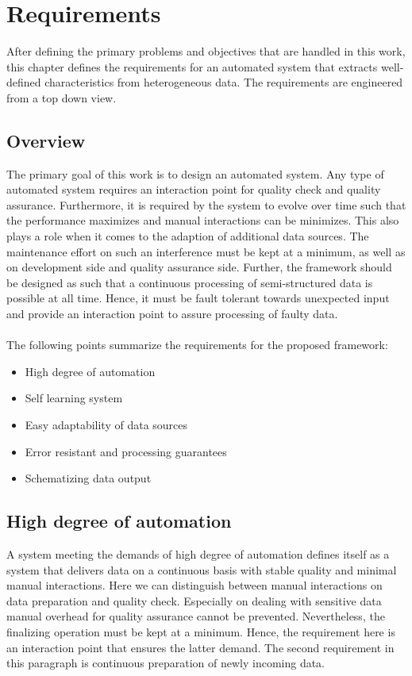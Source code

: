 \chapter{Requirements\label{cha:chapter3}}

After defining the primary problems and objectives that are handled in this work, this chapter defines the requirements for an automated system that extracts well-defined characteristics from heterogeneous data. The requirements are engineered from a top down view.

\section{Overview\label{sec:reqoverview}}

The primary goal of this work is to design an automated system. Any type of automated system requires an interaction point for quality check and quality assurance. Furthermore, it is required by the system to evolve over time such that the performance maximizes and manual interactions can be minimizes. This also plays a role when it comes to the adaption of additional data sources. The maintenance effort on such an interference must be kept at a minimum, as well as on development side and quality assurance side. Further, the framework should be designed as such that a continuous processing of semi-structured data is possible at all time. Hence, it must be fault tolerant towards unexpected input and provide an interaction point to assure processing of faulty data.
\\\\
The following points summarize the requirements for the proposed framework:
\begin{itemize}
\item High degree of automation
\item Self learning system
\item Easy adaptability of data sources
\item Error resistant and processing guarantees
\item Schematizing data output 
\end{itemize}

\section{High degree of automation}

A system meeting the demands of high degree of automation defines itself as a system that delivers data on a continuous basis with stable quality and minimal manual interactions. Here we can distinguish between manual interactions on data preparation and quality check. Especially on dealing with sensitive data manual overhead for quality assurance cannot be prevented. Nevertheless, the finalizing operation must be kept at a minimum. Hence, the requirement here is an interaction point that ensures the latter demand. The second requirement in this paragraph is continuous preparation of newly incoming data.

